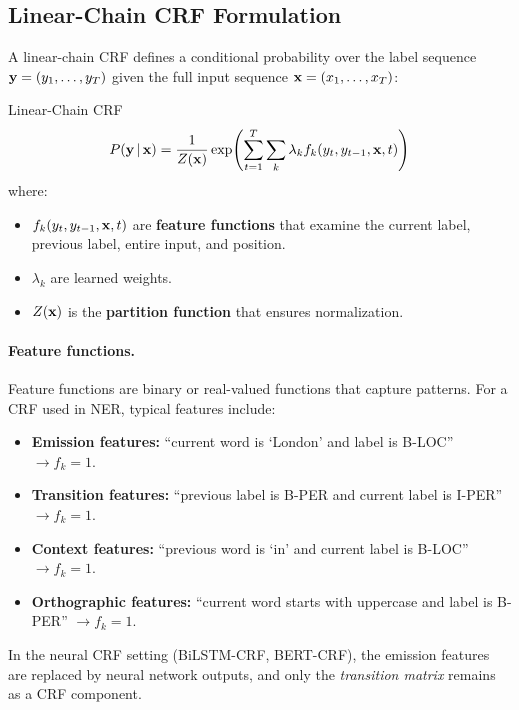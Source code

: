 \subsection{Linear-Chain CRF Formulation}

A linear-chain CRF defines a conditional probability over the label sequence
$\mathbf{y} = (y_1, \ldots, y_T)$ given the full input sequence
$\mathbf{x} = (x_1, \ldots, x_T)$:

\begin{mathresult}{Linear-Chain CRF}
\begin{equation}
P(\mathbf{y} \,|\, \mathbf{x}) = \frac{1}{Z(\mathbf{x})} \exp\!\left(\sum_{t=1}^{T} \sum_{k} \lambda_k f_k(y_t, y_{t-1}, \mathbf{x}, t)\right)
\label{eq:crf}
\end{equation}
where:
\begin{itemize}
    \item $f_k(y_t, y_{t-1}, \mathbf{x}, t)$ are \textbf{feature functions} that
          examine the current label, previous label, entire input, and position.
    \item $\lambda_k$ are learned weights.
    \item $Z(\mathbf{x})$ is the \textbf{partition function} that ensures normalization.
\end{itemize}
\end{mathresult}

\paragraph{Feature functions.}
Feature functions are binary or real-valued functions that capture patterns.
For a CRF used in NER, typical features include:

\begin{itemize}
    \item \textbf{Emission features:} ``current word is `London' and label is
          B-LOC'' $\to f_k = 1$.
    \item \textbf{Transition features:} ``previous label is B-PER and current
          label is I-PER'' $\to f_k = 1$.
    \item \textbf{Context features:} ``previous word is `in' and current label
          is B-LOC'' $\to f_k = 1$.
    \item \textbf{Orthographic features:} ``current word starts with uppercase
          and label is B-PER'' $\to f_k = 1$.
\end{itemize}

In the neural CRF setting (BiLSTM-CRF, BERT-CRF), the emission features are
replaced by neural network outputs, and only the \emph{transition matrix}
remains as a CRF component.

